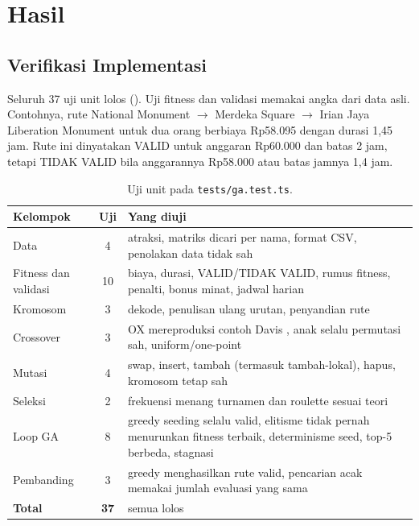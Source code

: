 \section{Hasil}

\subsection{Verifikasi Implementasi}
\label{sec:verifikasi}

Seluruh 37 uji unit lolos (). Uji fitness dan validasi memakai angka dari data asli. Contohnya, rute National Monument $\to$ Merdeka Square $\to$ Irian Jaya Liberation Monument untuk dua orang berbiaya Rp58.095 dengan durasi 1,45 jam. Rute ini dinyatakan VALID untuk anggaran Rp60.000 dan batas 2 jam, tetapi TIDAK VALID bila anggarannya Rp58.000 atau batas jamnya 1,4 jam.

\begin{table}[H]
\centering
\caption{Uji unit pada \texttt{tests/ga.test.ts}.}
\label{tab:uji}
\small
\begin{tabular}{@{}l c >{\raggedright\arraybackslash}p{9.6cm}@{}}
\toprule
\textbf{Kelompok} & \textbf{Uji} & \textbf{Yang diuji} \\
\midrule
Data & 4 & 201 atraksi, matriks dicari per nama, format CSV, penolakan data tidak sah \\
Fitness dan validasi & 10 & biaya, durasi, VALID/TIDAK VALID, rumus fitness, penalti, bonus minat, jadwal harian \\
Kromosom & 3 & dekode, penulisan ulang urutan, penyandian rute \\
Crossover & 3 & OX mereproduksi contoh Davis \cite{davis1985}, anak selalu permutasi sah, uniform/one-point \\
Mutasi & 4 & swap, insert, tambah (termasuk tambah-lokal), hapus, kromosom tetap sah \\
Seleksi & 2 & frekuensi menang turnamen dan roulette sesuai teori \\
Loop GA & 8 & greedy seeding selalu valid, elitisme tidak pernah menurunkan fitness terbaik, determinisme seed, top-5 berbeda, stagnasi \\
Pembanding & 3 & greedy menghasilkan rute valid, pencarian acak memakai jumlah evaluasi yang sama \\
\midrule
\textbf{Total} & \textbf{37} & semua lolos \\
\bottomrule
\end{tabular}
\end{table}

